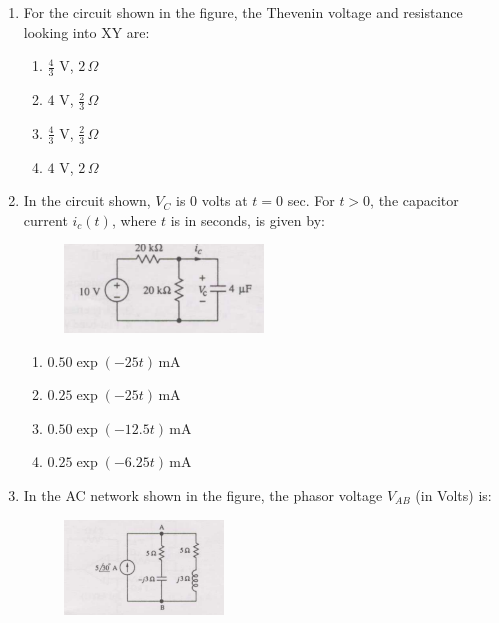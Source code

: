 \documentclass[journal,12pt,onecolumn]{IEEEtran}
\theoremstyle{remark}
\begin{document}
\begin{enumerate}
\item For the circuit shown in the figure, the Thevenin voltage and resistance looking into XY are: 
\hfill{}
\begin{multicols}{4}
\begin{enumerate}
    \item $\frac{4}{3}$ V, $2\,\Omega$
    \item $4$ V, $\frac{2}{3}\,\Omega$
    \item $\frac{4}{3}$ V, $\frac{2}{3}\,\Omega$
    \item $4$ V, $2\,\Omega$
\end{enumerate}
\end{multicols}

\item In the circuit shown, $V_C$ is 0 volts at $t=0$ sec. For $t>0$, the capacitor current $i_c(t)$, where $t$ is in seconds, is given by: 
\hfill{}

\begin{figure}[ht!]
    \centering
    \includegraphics[width=0.5\textwidth]{Q30.png}
    \caption{}
    \label{fig:Q30.png}
\end{figure}

\begin{enumerate}
  \item $0.50\exp(-25t)\,$mA
  \item $0.25\exp(-25t)\,$mA
  \item $0.50\exp(-12.5t)\,$mA
  \item $0.25\exp(-6.25t)\,$mA
\end{enumerate}

\item In the AC network shown in the figure, the phasor voltage $V_{AB}$ (in Volts) is: 

\begin{figure}[ht!]
    \centering
    \includegraphics[width=0.4\textwidth]{Q31.png}
    \caption{}
    \label{fig:Q31.png}
\end{figure}


\end{enumerate}
\end{document}
